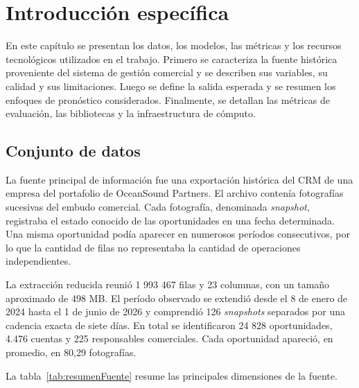 
\chapter{Introducción específica}

\label{Chapter2}

En este capítulo se presentan los datos, los modelos, las métricas y los recursos tecnológicos utilizados en el trabajo. Primero se caracteriza la fuente histórica proveniente del sistema de gestión comercial y se describen sus variables, su calidad y sus limitaciones. Luego se define la salida esperada y se resumen los enfoques de pronóstico considerados. Finalmente, se detallan las métricas de evaluación, las bibliotecas y la infraestructura de cómputo.

\section{Conjunto de datos}
\label{sec:conjuntoDatos}

La fuente principal de información fue una exportación histórica del CRM de una empresa del portafolio de OceanSound Partners. El archivo contenía fotografías sucesivas del embudo comercial. Cada fotografía, denominada \textit{snapshot}, registraba el estado conocido de las oportunidades en una fecha determinada. Una misma oportunidad podía aparecer en numerosos períodos consecutivos, por lo que la cantidad de filas no representaba la cantidad de operaciones independientes.

La extracción reducida reunió 1 993 467 filas y 23 columnas, con un tamaño aproximado de 498 MB. El período observado se extendió desde el 8 de enero de 2024 hasta el 1 de junio de 2026 y comprendió 126 \textit{snapshots} separados por una cadencia exacta de siete días. En total se identificaron 24 828 oportunidades, 4.476 cuentas y 225 responsables comerciales. Cada oportunidad apareció, en promedio, en 80,29 fotografías.

La tabla~\ref{tab:resumenFuente} resume las principales dimensiones de la fuente.

